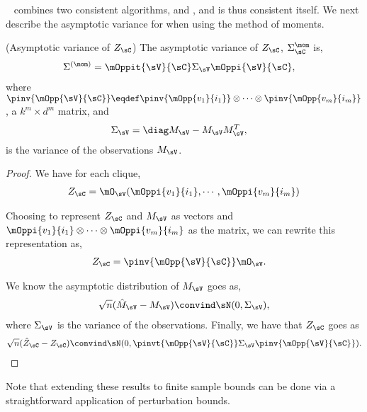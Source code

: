 \LearnMarginals~ combines two consistent algorithms, \TensorFactorize and
  \LearnClique, and is thus consistent itself. 
We next describe the asymptotic variance for \LearnClique when using the
  method of moments.
\begin{lemma}(Asymptotic variance of $Z_\sC$)
  \label{lem:mom-variance}  
  The asymptotic variance of $Z_\sC$, $\Sigma^\mom_\sC$ is,
  \begin{align*}
    \Sigma^{(\mom)} &= \mOppit{\sV}{\sC} \Sigma_\sV \mOppi{\sV}{\sC},
  \end{align*}
  where $\pinv{\mOpp{\sV}{\sC}} \eqdef \pinv{\mOpp{v_1}{i_1}} \otimes
    \cdots \otimes \pinv{\mOpp{v_m}{i_m}}$, a $k^m \times d^m$ matrix, and 
\begin{align*}
  \Sigma_\sV &= \diag  M_\sV  - M_\sV M_\sV^T,
\end{align*}
  is the variance of the observations $M_\sV$.
\end{lemma}
\begin{proof}
We have for each clique,
\begin{align*}
  Z_{\sC} &= \mO_\sV(\mOppi{v_1}{i_1},\cdots,\mOppi{v_m}{i_m}) \\
\end{align*}

Choosing to represent $Z_\sC$ and $M_\sV$ as vectors and
$\mOppi{v_1}{i_1} \otimes \cdots \otimes \mOppi{v_m}{i_m}$ as the
matrix, we can rewrite this representation as,
\begin{align*}
  Z_{\sC} &= \pinv{\mOpp{\sV}{\sC}} \mO_\sV.
\end{align*}

We know the asymptotic distribution of $M_\sV$ goes as,
\begin{align*}
  \sqrt{n}(\hat M_\sV - M_\sV) \convind \sN(0, \Sigma_\sV),
\end{align*}
where $\Sigma_\sV$ is the variance of the observations. 
Finally, we have that $Z_\sC$ goes as
\begin{align*}
  \sqrt{n}(\hat Z_\sC - Z_\sC) \convind \sN(0, \pinvt{\mOpp{\sV}{\sC}} \Sigma_\sV \pinv{\mOpp{\sV}{\sC}}).
\end{align*}
\end{proof}

Note that extending these results to finite sample bounds can be done
  via a straightforward application of perturbation bounds.

